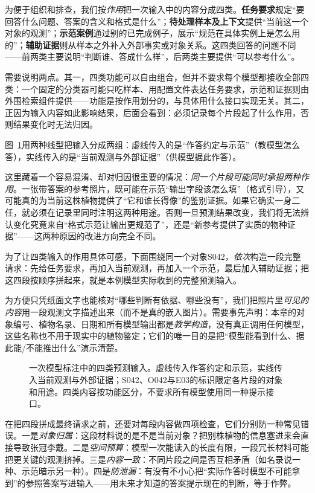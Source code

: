 为便于组织和排查，我们按\emph{作用}把一次输入中的内容分成四类。\textbf{任务要求}规定“要回答什么问题、答案的含义和格式是什么”；\textbf{待处理样本及上下文}提供“当前这一个对象的观测”；\textbf{示范案例}通过别的已完成例子，展示“规范在具体实例上是怎么用的”；\textbf{辅助证据}则从样本之外补入外部事实或对象关系。这四类回答的问题不同——前两类主要说明“判断谁、答成什么样”，后两类主要提供“可以参考什么”。

需要说明两点。其一，四类功能可以自由组合，但并不要求每个模型都接收全部四类：一个固定的分类器可能只吃样本、用配置文件表达任务要求，示范和证据则由外围检索组件提供——功能是按作用划分的，与具体用什么接口实现无关。其二，正因为输入内容如此影响结果，后面会看到：必须记录每个片段起了什么作用，否则结果变化时无法归因。

图~\ref{fig:knowledge-acquisition-input-composition}用两种线型把输入分成两组：虚线传入的是“作答约定与示范”（教模型怎么答），实线传入的是“当前观测与外部证据”（供模型据此作答）。

这里藏着一个容易混淆、却对归因很重要的情况：\emph{同一个片段可能同时承担两种作用}。一张带答案的参考照片，既可能在示范“输出字段该怎么填”（格式引导），又可能真的为当前这株植物提供了“它和谁长得像”的鉴别证据。如果它确实一身二任，就必须在记录里同时注明这两种用途。否则一旦预测结果改变，我们将无法辨认变化究竟来自“格式示范让输出更规范了”，还是“新参考提供了实质的物种证据”——这两种原因的改进方向完全不同。

为了让四类输入的作用具体可感，下面围绕同一个对象S042，\emph{依次}构造一段完整请求：先给任务要求，再加入当前观测，再加入一个示范，最后加入辅助证据；把这四段按顺序拼起来，就是本例模型实际收到的完整预测输入。

为方便只凭纸面文字也能核对“哪些判断有依据、哪些没有”，我们把照片里\emph{可见的内容}用一段观测文字描述出来（而不是真的嵌入图片）。需要事先声明：本章的对象编号、植物名录、日期和所有模型输出都是\emph{教学构造}，没有真正调用任何模型，这些名称也不用于现实中的植物鉴定；它们的唯一目的是把“模型能看到什么、据此能/不能推出什么”演示清楚。

\begin{figure}[htbp]
  \centering
  
  \caption{一次模型标注中的四类预测输入。虚线传入作答约定和示范，实线传入当前观测与外部证据；S042、O042与E03的标识限定各片段的对象和用途。四类内容按功能区分，不要求所有模型使用同一种提示接口。}
  \label{fig:knowledge-acquisition-input-composition}
\end{figure}

在把四段拼成最终请求之前，还要对每段内容做四项检查，它们分别防一种常见错误。一是\emph{对象归属}：这段材料说的是不是当前对象？把别株植物的信息塞进来会直接导致张冠李戴。二是\emph{空间预算}：模型一次能读入的长度有限，一段冗长材料可能把更关键的观测挤掉。三是\emph{内容一致}：不同片段之间是否互相矛盾（如名录说一种、示范暗示另一种）。四是\emph{防泄漏}：有没有不小心把“实际作答时模型不可能拿到”的参照答案写进输入——用未来才知道的答案提示现在的判断，等于作弊。

